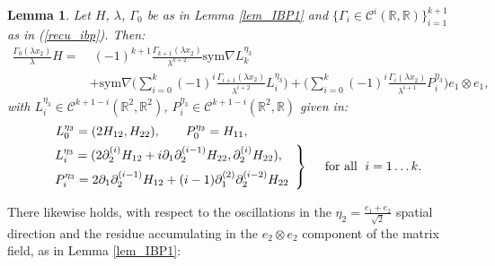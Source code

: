 \documentclass[reqno,twoside,11pt]{amsart}
\newcommand{\sym}{\mathrm{sym}}
\newcommand{\R}{\mathbb{R}}
\numberwithin{equation}{section}
\theoremstyle{plain}
\newtheorem{lemma}[theorem]{Lemma}
\theoremstyle{definition}
\begin{document}
\begin{lemma}\label{lem_IBP3}
Let $H$, $\lambda$, $\Gamma_0$ be as in Lemma \ref{lem_IBP1} and
$\{\Gamma_i\in \mathcal{C}^{i}(\R,\R)\}_{i=1}^{k+1}$ as in (\ref{recu_ibp}).
Then:
\begin{equation}\label{ibp3}
\begin{split}
\frac{\Gamma_0(\lambda x_2)}{\lambda}H = & \; (-1)^{k+1}\frac{\Gamma_{k+1}(\lambda
  x_2)}{\lambda^{k+2}} \sym\nabla  L_k^{\eta_3}  \\ & + \sym\nabla
\Big(\sum_{i=0}^k(-1)^i\frac{\Gamma_{i+1}(\lambda
  x_2)}{\lambda^{i+2}}L_i^{\eta_3}\Big) 
+ \Big( \sum_{i=0}^{k}(-1)^i\frac{\Gamma_i(\lambda
  x_2)}{\lambda^{i+1}} P_i^{\eta_3}\Big) e_1\otimes e_1,
\end{split}
\end{equation}
with $L_i^{\eta_3}\in\mathcal{C}^{k+1-i}(\R^2,\R^2)$,
$P_i^{\eta_3}\in\mathcal{C}^{k+1-i}(\R^2,\R)$ given in:
\begin{equation}\label{coef_ibp3}
\begin{split}
& \;\; \;  L_0^{\eta_3} = (2H_{12}, H_{22}), \qquad P_0^{\eta_3} = H_{11},\\
& \left.\begin{array}{l} L_i^{\eta_3}= (2\partial_2^{(i)}H_{12} +
i\partial_1\partial_2^{(i-1)}H_{22}, \partial_2^{(i)}H_{22}), \vspace{2mm} 
\\  P_i^{\eta_3} = 2\partial_1\partial_2^{(i-1)}H_{12} +
(i-1)\partial_1^{(2)}\partial_2^{(i-2)}H_{22} \end{array}\right\}
\quad \mbox{ for all }\; i=1\ldots k.
\end{split}
\end{equation}
\end{lemma}

\medskip

There likewise holds, with respect to the oscillations in the
$\eta_2=\frac{e_1+e_2}{\sqrt{2}}$ spatial direction and the
residue accumulating in the $e_2\otimes e_2$ component of the
matrix field, as in Lemma \ref{lem_IBP1}:
\end{document}
